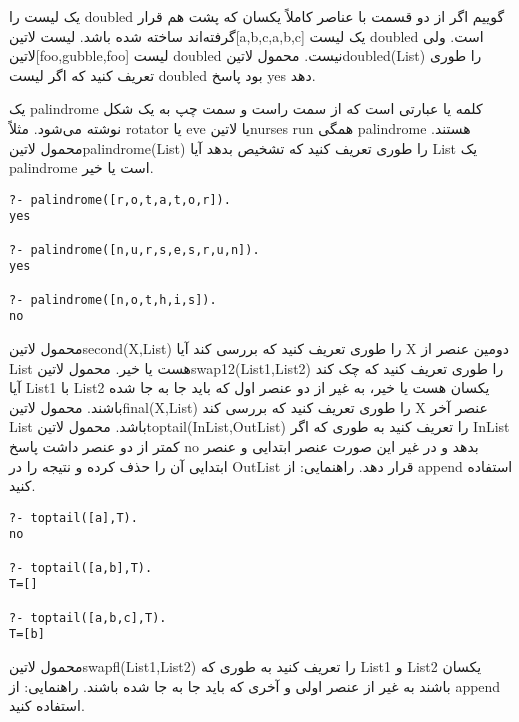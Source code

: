 \begin{exercise}
یک لیست را doubled گوییم اگر از دو قسمت با عناصر کاملاً یکسان که پشت هم قرار گرفته‌اند ساخته شده باشد. لیست ‌لاتین{[a,b,c,a,b,c]} یک لیست doubled است. ولی ‌لاتین{[foo,gubble,foo]} لیست doubled‌ نیست. محمول ‌لاتین{doubled(List)} را طوری تعریف کنید که اگر لیست doubled بود پاسخ yes دهد.
\end{exercise}

\begin{exercise}
یک palindrome کلمه یا عبارتی است که از سمت راست و سمت چپ به یک شکل  نوشته می‌شود. مثلاً rotator یا eve یا ‌لاتین{nurses run} همگی palindrome هستند. محمول ‌لاتین{palindrome(List)} را طوری تعریف کنید که تشخیص بدهد آیا List یک palindrome است یا خیر.
\begin{latin}
\begin{lstlisting}
?- palindrome([r,o,t,a,t,o,r]).
yes

?- palindrome([n,u,r,s,e,s,r,u,n]).
yes

?- palindrome([n,o,t,h,i,s]).
no
\end{lstlisting}
\end{latin}
\end{exercise}

\begin{exercise}
\begin{enumerate}
 محمول ‌لاتین{second(X,List)} را طوری تعریف کنید که بررسی کند آیا X دومین عنصر از List هست یا خیر.
 محمول ‌لاتین{swap12(List1,List2)} را طوری تعریف کنید که چک کند آیا List1 با List2 یکسان هست یا خیر، به غیر از دو عنصر اول که باید جا به جا شده باشند.
 محمول ‌لاتین{final(X,List)} را طوری تعریف کنید که بررسی کند X عنصر آخر List باشد.
 محمول ‌لاتین{toptail(InList,OutList)} را تعریف کنید به طوری که اگر InList کمتر از دو عنصر داشت پاسخ no بدهد و در غیر این صورت عنصر ابتدایی و عنصر ابتدایی آن را حذف کرده و نتیجه را در OutList قرار دهد. راهنمایی: از append استفاده کنید.
\begin{latin}
\begin{lstlisting}
?- toptail([a],T).
no

?- toptail([a,b],T).
T=[]

?- toptail([a,b,c],T).
T=[b]
\end{lstlisting}
\end{latin}
 محمول ‌لاتین{swapfl(List1,List2)} را تعریف کنید به طوری که List1 و List2 یکسان باشند به غیر از عنصر اولی و آخری که باید جا به جا شده باشند. راهنمایی: از append استفاده کنید.
\end{enumerate}
\end{exercise}

